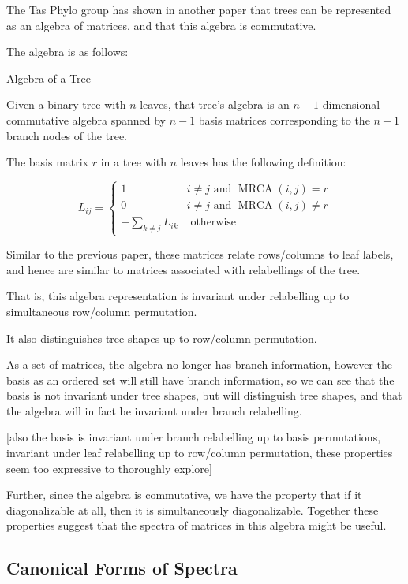 \documentclass{article}
\DeclareMathOperator{\MRCA}{MRCA}
\begin{document}
The Tas Phylo group has shown in another paper that trees can be represented as
an algebra of matrices, and that this algebra is commutative.

The algebra is as follows:

\begin{definition} Algebra of a Tree

	Given a binary tree with $n$ leaves, that tree's algebra is an
	$n-1$-dimensional commutative algebra spanned by $n-1$ basis matrices
	corresponding to the $n-1$ branch nodes of the tree.

	The basis matrix $r$ in a tree with $n$ leaves has the following
	definition:
\end{definition}
	\[ L_{ij} = \begin{cases}
		1 & i \neq j \textrm{ and } \MRCA(i, j) = r\\
		0 & i \neq j \textrm{ and } \MRCA(i, j) \neq r\\
		-\sum_{k \neq j} L_{ik} & \textrm{ otherwise}
	\end{cases} \]


Similar to the previous paper, these matrices relate rows/columns to leaf
labels, and hence are similar to matrices associated with relabellings of the
tree.

That is, this algebra representation is invariant under relabelling up to
simultaneous row/column permutation.

It also distinguishes tree shapes up to row/column permutation.

As a set of matrices, the algebra no longer has branch information, however the
basis as an ordered set will still have branch information, so we can see that
the basis is not invariant under tree shapes, but will distinguish tree shapes,
and that the algebra will in fact be invariant under branch relabelling.

[also the basis is invariant under branch relabelling up to basis permutations,
invariant under leaf relabelling up to row/column permutation, these properties
seem too expressive to thoroughly explore]

Further, since the algebra is commutative, we have the property that if it
diagonalizable at all, then it is simultaneously diagonalizable.
Together these properties suggest that the spectra of matrices in this algebra
might be useful.

\subsection{Canonical Forms of Spectra}
\end{document}
